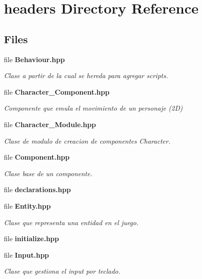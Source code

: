 \section{headers Directory Reference}
\label{dir_7f57b1e41c5acd0e859ae5f3a2b075a9}
\subsection*{Files}
\begin{DoxyCompactItemize}
\item 
file \textbf{ Behaviour.\+hpp}
\begin{DoxyCompactList}\small\item\em Clase a partir de la cual se hereda para agregar scripts. \end{DoxyCompactList}\item 
file \textbf{ Character\+\_\+\+Component.\+hpp}
\begin{DoxyCompactList}\small\item\em Componente que emula el movimiento de un personaje (2D) \end{DoxyCompactList}\item 
file \textbf{ Character\+\_\+\+Module.\+hpp}
\begin{DoxyCompactList}\small\item\em Clase de modulo de creacion de componentes Character. \end{DoxyCompactList}\item 
file \textbf{ Component.\+hpp}
\begin{DoxyCompactList}\small\item\em Clase base de un componente. \end{DoxyCompactList}\item 
file \textbf{ declarations.\+hpp}
\item 
file \textbf{ Entity.\+hpp}
\begin{DoxyCompactList}\small\item\em Clase que representa una entidad en el juego. \end{DoxyCompactList}\item 
file \textbf{ initialize.\+hpp}
\item 
file \textbf{ Input.\+hpp}
\begin{DoxyCompactList}\small\item\em Clase que gestiona el input por teclado. \end{DoxyCompactList}\item 

\end{DoxyCompactItemize}
